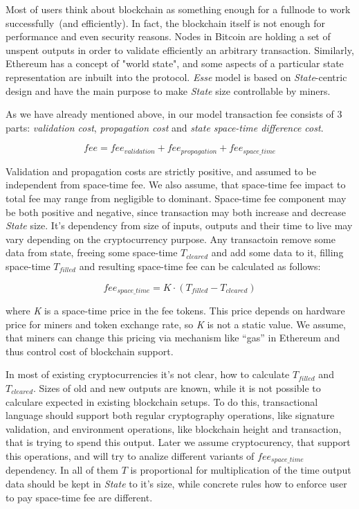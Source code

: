 \documentclass[]{article}   %
\newcommand{\authnote}[2]{\marginpar{\parbox{\marginparwidth}{\tiny %
  \textsf{#1 {\textcolor{blue}{notes: #2}}}}}%
  \textcolor{blue}{\textbf{\dag}}}
\newcommand{\authnote}[2]{
  \textsf{#1 \textcolor{blue}{: #2}}}
\newcommand{\authnote}[2]{}
\newcommand{\dnote}[1]{{\authnote{\textcolor{blue}{Dima notes}}{#1}}}
\newcommand{\esse}{\textit{Esse}}
\newcommand{\state}{\textit{State}}
\begin{document}
Most of users think about blockchain as something enough for a fullnode to work successfully~(and efficiently). In fact, the blockchain itself is not enough for performance and even security reasons. Nodes in Bitcoin are holding a set of unspent outputs in order to validate efficiently an arbitrary transaction. Similarly, Ethereum\cite{ethyp} has a concept of "world state", and some aspects of a particular state representation are inbuilt into the protocol. \esse{} model is based on \state{}-centric design and have the main purpose to make \state{} size controllable by miners.

As we have already mentioned above, in our model transaction fee consists of 3 parts: \textit{validation cost}, \textit{propagation cost} and \textit{state space-time difference cost}.

\begin{equation}
fee = fee_{validation} + fee_{propagation} + fee_{space\_time}
\end{equation}

 \dnote{should we require from total fee to be positive?}

Validation and propagation costs are strictly positive, and assumed to be independent from space-time fee. We also assume, that space-time fee impact to total fee may range from negligible to dominant. Space-time fee component may be both positive and negative, since transaction may both increase and decrease \state{} size. It's dependency from size of inputs, outputs and their time to live may vary depending on the cryptocurrency purpose. Any transactoin remove some data from state, freeing some space-time \textit{$T_{cleared}$} and add some data to it, filling space-time \textit{$T_{filled}$} and resulting space-time fee can be calculated as follows:

 \dnote{May be it's better just mention, that user should pay for space-time of all his outputs}

\begin{equation}
fee_{space\_time} = K \cdot (T_{filled} - T_{cleared})
\end{equation}

where \textit{K} is a space-time price in the fee tokens. This price depends on hardware price for miners and token exchange rate, so \textit{K} is not a static value. We assume, that miners can change this pricing via mechanism like ``gas'' in Ethereum and thus control cost of blockchain support.

In most of existing cryptocurrencies it's not clear, how to calculate $T_{filled}$ and $T_{cleared}$. Sizes of old and new outputs are known, while it is not possible to calculare expected in existing blockchain setups. To do this, transactional language should support both regular cryptography operations, like signature validation, and environment operations, like blockchain height and transaction, that is trying to spend this output. Later we assume cryptocurency, that support this operations, and will try to analize different variants of $fee_{space\_time}$ dependency. In all of them $T$ is proportional for multiplication of the time output data should be kept in \state{} to it's size, while concrete rules how to enforce user to pay space-time fee are different.
\end{document}
